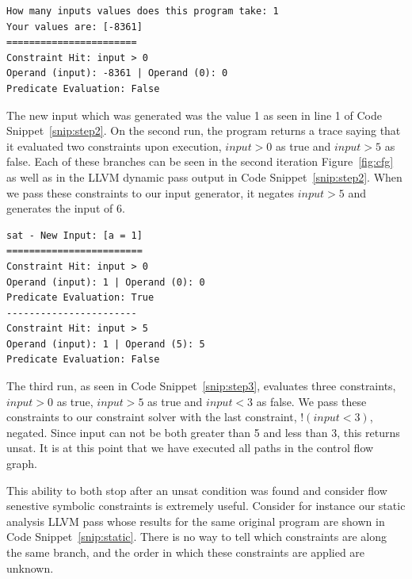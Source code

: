\vspace{-0.6cm}

\begin{lstlisting}[caption={System Output - First Iteration}, label=snip:step1]
How many inputs values does this program take: 1
Your values are: [-8361]
=======================
Constraint Hit: input > 0
Operand (input): -8361 | Operand (0): 0
Predicate Evaluation: False
\end{lstlisting}

The new input which was generated was the value 1 as seen in line 1 of Code Snippet~\ref{snip:step2}.
On the second run, the program returns a trace saying that it evaluated two constraints upon execution, $input > 0$ as true and $input > 5$ as false. Each of these branches can be seen in the second iteration Figure~\ref{fig:cfg} as well as in the LLVM dynamic pass output in Code Snippet~\ref{snip:step2}. When we pass these constraints to our input generator, it negates $input > 5$ and generates the input of 6. 

\vspace{-0.6cm}

\begin{lstlisting}[caption={System Output - Second Iteration}, label=snip:step2]
sat - New Input: [a = 1]
========================
Constraint Hit: input > 0
Operand (input): 1 | Operand (0): 0
Predicate Evaluation: True
-----------------------
Constraint Hit: input > 5
Operand (input): 1 | Operand (5): 5
Predicate Evaluation: False
\end{lstlisting}

The third run, as seen in Code Snippet~\ref{snip:step3}, evaluates three constraints, $input > 0$ as true, $input > 5$ as true and $input < 3$ as false. We pass these constraints to our constraint solver with the last constraint, $!(input < 3)$, negated. Since input can not be both greater
than 5 and less than 3, this returns unsat. It is at this point that we have executed all paths in the control flow graph.

This ability to both stop after an unsat condition was found and consider flow senestive symbolic constraints is extremely useful. Consider for instance our static analysis LLVM pass whose results for the same original program are shown in Code Snippet~\ref{snip:static}. There is no way to tell which constraints are along the same branch, and the order in which these constraints are applied are unknown. 

\vspace{-0.6cm}

